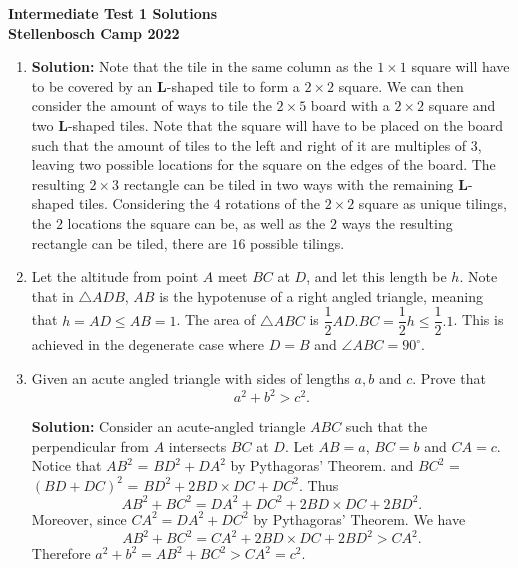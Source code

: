 \documentclass{article}
\begin{document}
\thispagestyle{empty}

\begin{center}
  \textbf{\Large Intermediate Test 1 Solutions}
  \\ \vspace{1em}
  \textbf{\large Stellenbosch Camp 2022}
\end{center}

\bigskip

\begin{enumerate}[itemsep=24pt]

\item %
\textbf{Solution:} Note that the tile in the same column as the $1\times1$ square will have to be covered by an $\mathbf{L}$-shaped tile to form a $2\times2$ square. We can then consider the amount of ways to tile the $2\times5$ board with a $2\times2$ square and two $\mathbf{L}$-shaped tiles. Note that the square will have to be placed on the board such that the amount of tiles to the left and right of it are multiples of $3$, leaving two possible locations for the square on the edges of the board. The resulting $2\times3$ rectangle can be tiled in two ways with the remaining $\mathbf{L}$-shaped tiles. Considering the $4$ rotations of the $2\times2$ square as unique tilings, the $2$ locations the square can be, as well as the $2$ ways the resulting rectangle can be tiled, there are $16$ possible tilings. 


\item %
Let the altitude from point $A$ meet $BC$ at $D$, and let this length be $h$. Note that in $\triangle ADB$, $AB$ is the hypotenuse of a right angled triangle, meaning that $h = AD \leq AB = 1$. The area of $\triangle ABC$ is $\dfrac{1}{2}AD.BC = \dfrac{1}{2}h \leq \dfrac{1}{2}.1$. This is achieved in the degenerate case where $D = B$ and $\angle ABC = 90^{\circ}$.


\item %
Given an acute angled triangle with sides of lengths $a,b$ and $c$. Prove that \[a^2 + b^2 > c^2.\]

\textbf{Solution:} Consider an acute-angled triangle $ABC$ such that the perpendicular from $A$ intersects $BC$ at $D$. Let $AB=a$, $BC=b$ and $CA=c$. Notice that $AB^{2}$ = $BD^{2} + DA^{2}$ by Pythagoras' Theorem.  and $BC^{2}$ = $(BD + DC)^{2}$ = $BD^{2} + 2BD\times DC + DC^{2}$. Thus
\[ AB^{2} + BC^{2} = DA^{2} + DC^{2} + 2BD \times DC + 2BD^{2}. \]
Moreover, since $CA^{2} = DA^{2} + DC^{2}$ by Pythagoras' Theorem. We have
\[ AB^{2} + BC^{2} = CA^{2} + 2BD \times DC + 2BD^{2} > CA^{2}. \]
Therefore $a^{2} + b^{2} = AB^{2} + BC^{2} > CA^{2} = c^{2}$.



\end{enumerate}
\end{document}
